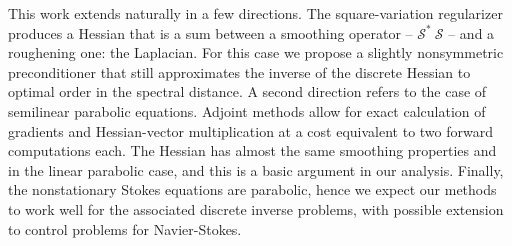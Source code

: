 \documentclass{report}
\begin{document}
This work extends naturally in a few directions. The square-variation
regularizer produces a Hessian that is a sum between a smoothing
operator -- ${\mathcal S}^*\:{\mathcal S}$ -- and a roughening one:
the Laplacian. For this case we propose a slightly nonsymmetric
preconditioner that still approximates the inverse of the discrete
Hessian to optimal order in the spectral distance. A second direction
refers to the case of semilinear parabolic equations. Adjoint methods
allow for exact calculation of gradients and Hessian-vector
multiplication at a cost equivalent to two forward computations
each. The Hessian has almost the same smoothing properties and in the
linear parabolic case, and this is a basic argument in our
analysis. Finally, the nonstationary Stokes equations are parabolic,
hence we expect our methods to work well for the associated discrete
inverse problems, with possible extension to control problems for
Navier-Stokes.
\end{document}
